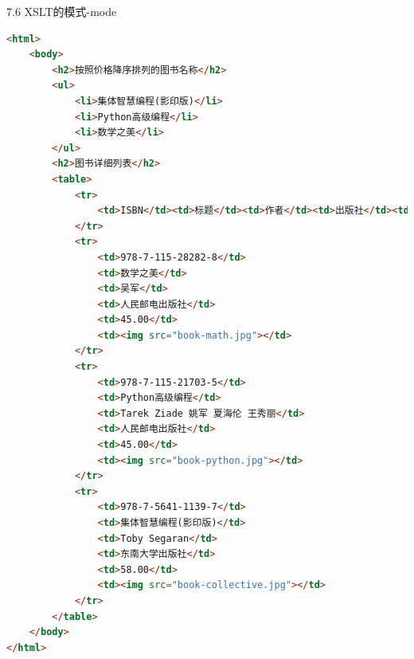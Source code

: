 \begin{frame}{7.6 XSLT的模式-mode}
\begin{lstlisting}[tabsize=8, basicstyle=\small\tt, language=HTML, caption=转换结果]
<html>
    <body>
        <h2>按照价格降序排列的图书名称</h2>
        <ul>
            <li>集体智慧编程(影印版)</li>
            <li>Python高级编程</li>
            <li>数学之美</li>
        </ul>
        <h2>图书详细列表</h2>
        <table>
            <tr>
                <td>ISBN</td><td>标题</td><td>作者</td><td>出版社</td><td>价格</td>
            </tr>
            <tr>
                <td>978-7-115-28282-8</td>
                <td>数学之美</td>
                <td>吴军</td>
                <td>人民邮电出版社</td>
                <td>45.00</td>
                <td><img src="book-math.jpg"></td>
            </tr>
            <tr>
                <td>978-7-115-21703-5</td>
                <td>Python高级编程</td>
                <td>Tarek Ziade 姚军 夏海伦 王秀丽</td>
                <td>人民邮电出版社</td>
                <td>45.00</td>
                <td><img src="book-python.jpg"></td>
            </tr>
            <tr>
                <td>978-7-5641-1139-7</td>
                <td>集体智慧编程(影印版)</td>
                <td>Toby Segaran</td>
                <td>东南大学出版社</td>
                <td>58.00</td>
                <td><img src="book-collective.jpg"></td>
            </tr>
        </table>
    </body>
</html>
\end{lstlisting}
\end{frame}



